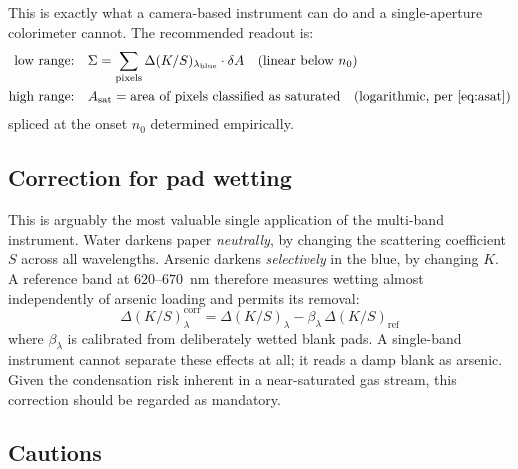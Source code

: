 \documentclass[11pt,a4paper]{article}
\begin{document}
This is exactly what a camera-based instrument can do and a single-aperture
colorimeter cannot. The recommended readout is:
\begin{align}
  \text{low range:}\quad & \Sigma = \sum_{\text{pixels}}
    \Delta(K/S)_{\lambda_{\text{blue}}} \cdot \delta A
    \quad\text{(linear below } n_0) \\
  \text{high range:}\quad & A_{\text{sat}} =
    \text{area of pixels classified as saturated}
    \quad\text{(logarithmic, per~\eqref{eq:asat})}
\end{align}
spliced at the onset $n_0$ determined empirically.

\subsection{Correction for pad wetting}

This is arguably the most valuable single application of the multi-band
instrument. Water darkens paper \emph{neutrally}, by changing the scattering
coefficient $S$ across all wavelengths. Arsenic darkens \emph{selectively}
in the blue, by changing $K$. A reference band at $620$--$670$~nm therefore
measures wetting almost independently of arsenic loading and permits its
removal:
\begin{equation}
  \Delta(K/S)^{\text{corr}}_\lambda
  = \Delta(K/S)_\lambda
  - \beta_\lambda\,\Delta(K/S)_{\text{ref}}
\end{equation}
where $\beta_\lambda$ is calibrated from deliberately wetted blank pads.
A single-band instrument cannot separate these effects at all; it reads a
damp blank as arsenic. Given the condensation risk inherent in a
near-saturated gas stream, this correction should be regarded as mandatory.

\subsection{Cautions}
\end{document}
